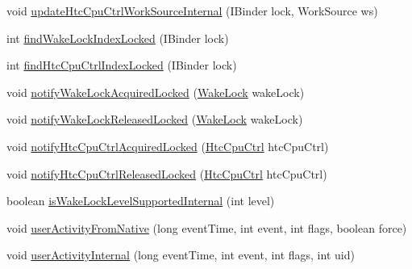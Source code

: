 \begin{DoxyCompactItemize}
\item 
void \hyperlink{classcom_1_1android_1_1server_1_1power_1_1PowerManagerService_a287f4e2e105a54abffff1befaea4a660}{update\-Htc\-Cpu\-Ctrl\-Work\-Source\-Internal} (I\-Binder lock, Work\-Source ws)
\item 
int \hyperlink{classcom_1_1android_1_1server_1_1power_1_1PowerManagerService_a1bb8d588504dfc1b1e6f7ba7ba373a7c}{find\-Wake\-Lock\-Index\-Locked} (I\-Binder lock)
\item 
int \hyperlink{classcom_1_1android_1_1server_1_1power_1_1PowerManagerService_a7b7f62155456138e4ffd35c9fcaf3a79}{find\-Htc\-Cpu\-Ctrl\-Index\-Locked} (I\-Binder lock)
\item 
void \hyperlink{classcom_1_1android_1_1server_1_1power_1_1PowerManagerService_a21a264a61787f0794bfe81ae1f8ab9c1}{notify\-Wake\-Lock\-Acquired\-Locked} (\hyperlink{classcom_1_1android_1_1server_1_1power_1_1PowerManagerService_1_1WakeLock}{Wake\-Lock} wake\-Lock)
\item 
void \hyperlink{classcom_1_1android_1_1server_1_1power_1_1PowerManagerService_a9f598b614a30547774de431e9b8017f4}{notify\-Wake\-Lock\-Released\-Locked} (\hyperlink{classcom_1_1android_1_1server_1_1power_1_1PowerManagerService_1_1WakeLock}{Wake\-Lock} wake\-Lock)
\item 
void \hyperlink{classcom_1_1android_1_1server_1_1power_1_1PowerManagerService_a5768793a3d865057caf3ca310a0135e0}{notify\-Htc\-Cpu\-Ctrl\-Acquired\-Locked} (\hyperlink{classcom_1_1android_1_1server_1_1power_1_1PowerManagerService_1_1HtcCpuCtrl}{Htc\-Cpu\-Ctrl} htc\-Cpu\-Ctrl)
\item 
void \hyperlink{classcom_1_1android_1_1server_1_1power_1_1PowerManagerService_a8fdcc3347a886221347987941e3ffba2}{notify\-Htc\-Cpu\-Ctrl\-Released\-Locked} (\hyperlink{classcom_1_1android_1_1server_1_1power_1_1PowerManagerService_1_1HtcCpuCtrl}{Htc\-Cpu\-Ctrl} htc\-Cpu\-Ctrl)
\item 
boolean \hyperlink{classcom_1_1android_1_1server_1_1power_1_1PowerManagerService_a805e9c04fceaee1aaefe547c9c124fb1}{is\-Wake\-Lock\-Level\-Supported\-Internal} (int level)
\item 
void \hyperlink{classcom_1_1android_1_1server_1_1power_1_1PowerManagerService_afe3f2eda398d15da4350fceb83134b15}{user\-Activity\-From\-Native} (long event\-Time, int event, int flags, boolean force)
\item 
void \hyperlink{classcom_1_1android_1_1server_1_1power_1_1PowerManagerService_a5b71f3f25440eca5ea630197308ba3c3}{user\-Activity\-Internal} (long event\-Time, int event, int flags, int uid)

\end{DoxyCompactItemize}
